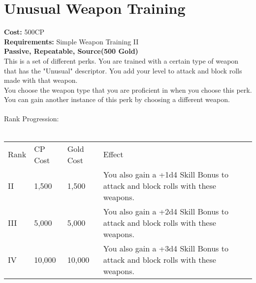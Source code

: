 \section{Unusual Weapon Training}\label{perk:unusualWeaponTraining}
\textbf{Cost:} 500CP\\
\textbf{Requirements:} Simple Weapon Training II\\
\textbf{Passive, Repeatable, Source(500 Gold)}\\
This is a set of different perks.
You are trained with a certain type of weapon that has the "Unusual" descriptor.
You add your level to attack and block rolls made with that weapon.\\
You choose the weapon type that you are proficient in when you choose this perk.
You can gain another instance of this perk by choosing a different weapon.\\
\\
Rank Progression:\\
\\
\begin{longtable}{l | l | l | p{9cm}}
	Rank & CP Cost & Gold Cost & Effect\\
	II & 1,500 & 1,500 & You also gain a +1d4 Skill Bonus to attack and block rolls with these weapons.\\
	III & 5,000 & 5,000 & You also gain a +2d4 Skill Bonus to attack and block rolls with these weapons.\\
	IV & 10,000 & 10,000 & You also gain a +3d4 Skill Bonus to attack and block rolls with these weapons.\\
\end{longtable}